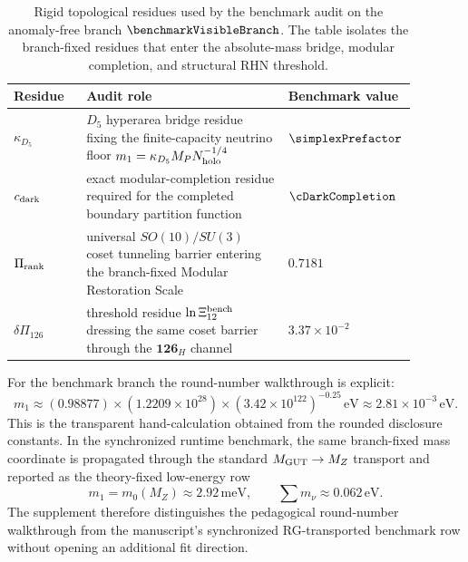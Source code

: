 \documentclass[11pt]{article}
\begin{document}
\begin{table}[t]
\centering
\scriptsize
\setlength{\tabcolsep}{4pt}
\renewcommand{\arraystretch}{1.15}
\begin{tabular}{>{\raggedright\arraybackslash}p{0.18\linewidth}>{\raggedright\arraybackslash}p{0.50\linewidth}>{\centering\arraybackslash}p{0.20\linewidth}}
\hline
Residue & Audit role & Benchmark value \\
\hline
$\kappa_{D_5}$ & $D_5$ hyperarea bridge residue fixing the finite-capacity neutrino floor $m_1=\kappa_{D_5}M_PN_{\rm holo}^{-1/4}$ & $\simplexPrefactor$ \\

$c_{\rm dark}$ & exact modular-completion residue required for the completed boundary partition function & $\cDarkCompletion$ \\

$\Pi_{\rm rank}$ & universal $SO(10)/SU(3)$ coset tunneling barrier entering the branch-fixed Modular Restoration Scale & $0.7181$ \\

$\delta\Pi_{126}$ & threshold residue $\ln\Xi_{12}^{\rm bench}$ dressing the same coset barrier through the $\mathbf{126}_H$ channel & $3.37\times10^{-2}$ \\
\hline
\end{tabular}
\caption{Rigid topological residues used by the benchmark audit on the anomaly-free branch $\benchmarkVisibleBranch$. The table isolates the branch-fixed residues that enter the absolute-mass bridge, modular completion, and structural RHN threshold.}
\label{tab:s4-rigid-residues}
\end{table}

For the benchmark branch the round-number walkthrough is explicit:
\begin{equation}
 m_1
 \approx
 (0.98877)\times(1.2209\times10^{28})\times(3.42\times10^{122})^{-0.25}\,\mathrm{eV}
 \approx
 2.81\times10^{-3}\,\mathrm{eV}.
\end{equation}
This is the transparent hand-calculation obtained from the rounded disclosure
constants. In the synchronized runtime benchmark, the same branch-fixed mass
coordinate is propagated through the standard $M_{\rm GUT}\to M_Z$ transport and
reported as the theory-fixed low-energy row
\begin{equation}
 m_1=m_0(M_Z)\approx2.92\,\mathrm{meV},
 \qquad
 \sum m_\nu\approx0.062\,\mathrm{eV}.
\end{equation}
The supplement therefore distinguishes the pedagogical round-number walkthrough
from the manuscript's synchronized RG-transported benchmark row without opening
an additional fit direction.
\end{document}
